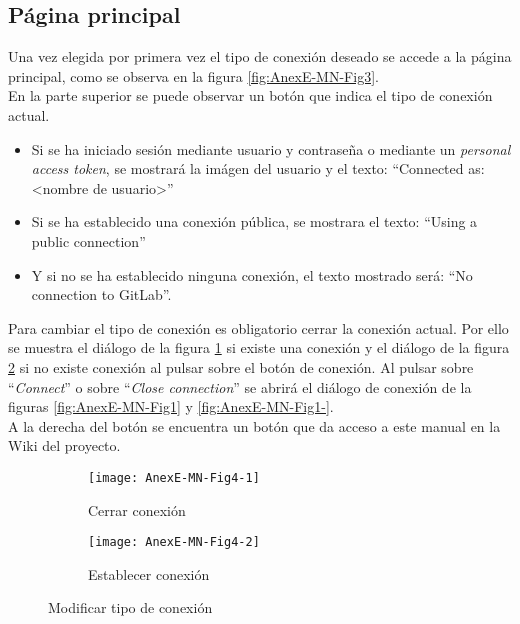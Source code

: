 \subsection{Página principal}
Una vez elegida por primera vez el tipo de conexión deseado se accede a la página principal, como se observa en la figura \ref{fig:AnexE-MN-Fig3}.\\
En la parte superior se puede observar un botón que indica el tipo de conexión actual.
\begin{itemize}
	\tightlist
	\item Si se ha iniciado sesión mediante usuario y contraseña o mediante un \textit{personal access token}, se mostrará la imágen del usuario y el texto: ``Connected as: <nombre de usuario>''
	\item Si se ha establecido una conexión pública, se mostrara el texto: ``Using a public connection''
	\item Y si no se ha establecido ninguna conexión, el texto mostrado será: ``No connection to GitLab''.
\end{itemize}
Para cambiar el tipo de conexión es obligatorio cerrar la conexión actual. Por ello se muestra el diálogo de la figura \ref{fig:AnexE-MN-Fig4-1} si existe una conexión y el diálogo de la figura \ref{fig:AnexE-MN-Fig4-2} si no existe conexión al pulsar sobre el botón de conexión. Al pulsar sobre ``\textit{Connect}'' o sobre ``\textit{Close connection}'' se abrirá el diálogo de conexión de la figuras \ref{fig:AnexE-MN-Fig1} y \ref{fig:AnexE-MN-Fig1-}.\\
A la derecha del botón se encuentra un botón que da acceso a este manual en la Wiki del proyecto.\\
\begin{figure}[h]
	\centering
	\begin{subfigure}{.45\textwidth}
		\centering
		\texttt{[image: AnexE-MN-Fig4-1]}
		\caption{Cerrar conexión}
		\label{fig:AnexE-MN-Fig4-1}
	\end{subfigure}\hfill
	\begin{subfigure}{.45\textwidth}
		\centering
		\texttt{[image: AnexE-MN-Fig4-2]}
		\caption{Establecer conexión}
		\label{fig:AnexE-MN-Fig4-2}
	\end{subfigure}
	\caption{Modificar tipo de conexión}
	\label{fig:AnexE-MN-Fig4}
\end{figure}
